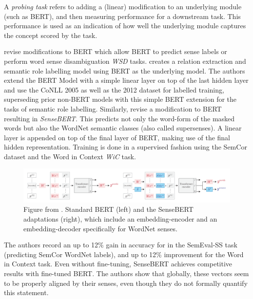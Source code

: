 \documentclass[a4paper,12pt,oneside,openright]{report}
\begin{document}
A \textit{probing task} refers to adding a (linear) modification to an underlying module (such as BERT), and then measuring performance for a downstream task.
This performance is used as an indication of how well the underlying module captures the concept scored by the task.

\cite{shi19, levine19, wiedmann19} revise modifications to BERT which allow BERT to predict sense labels or perform word sense disambiguation \textit{WSD} tasks. 
\cite{shi19} creates a relation extraction and semantic role labelling model using BERT as the underlying model.
The authors extend the BERT Model with a simple linear layer on top of the last hidden layer and use the CoNLL 2005 \cite{carreras04} as well as the 2012  dataset \cite{pradhan13} for labelled training, superseding prior non-BERT models with this simple BERT extension for the tasks of semantic role labelling. 
Similarly, \cite{levine19} revise a modification to BERT resulting in \textit{SenseBERT}.
This predicts not only the word-form of the masked words but also the WordNet semantic classes (also called supersenses).
A linear layer is appended on top of the final layer of BERT, making use of the final hidden representation.
Training is done in a supervised fashion using the SemCor dataset and the Word in Context \textit{WiC} task.

\begin{figure}
	\center
  \includegraphics[width=\linewidth]{./assets/relatedwork/sensebert.png}
  \caption{Figure from \cite{levine19}. Standard BERT (left) and the SenseBERT adaptations (right), which include an embedding-encoder and an embedding-decoder specifically for WordNet senses.}
  \label{fig:embeddings_by_language}
\end{figure}

The authors record an up to 12\% gain in accuracy for in the SemEval-SS task (predicting SemCor WordNet labels), and up to 12\% improvement for the Word in Context task.
Even without fine-tuning, SenseBERT achieves competitive results with fine-tuned BERT.
The authors show that globally, these vectors seem to be properly aligned by their senses, even though they do not formally quantify this statement. \\
\end{document}
